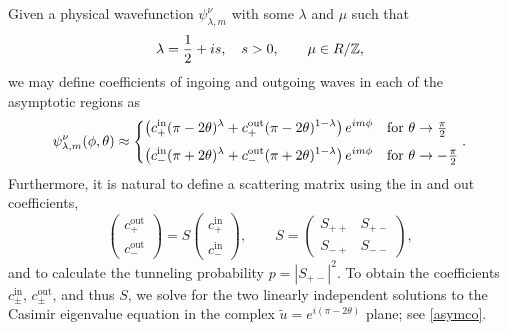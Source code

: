 \documentclass[12pt]{article}
\newcommand{\be}{\begin{equation}}
\newcommand{\ee}{\end{equation}}
\newcommand{\ZZ}{\mathbb{Z}}
\newcommand{\RR}{\mathbb{R}}
\newcommand{\IN}{\text{in}}
\newcommand{\OUT}{\text{out}}
\newcommand{\tht}{\theta}
\newcommand{\lam}{\lambda}
\newcommand{\ov}{\over}
\def\RR{R}
\begin{document}
Given a physical wavefunction $\psi_{\lam, m}^{\nu}$ with some $\lam$ and $\mu$ such that
\be
\lam={1 \ov 2}+i s,\quad s>0, \qquad \mu\in \RR/\ZZ,
\ee
we may define coefficients of ingoing and outgoing waves in each of the asymptotic regions as
\be \label{asymc}
\psi_{\lam,m}^{\nu}(\phi,\theta)\approx\begin{dcases}
\left(c_{+}^{\IN}(\pi-2\theta)^{\lambda}
+c_{+}^{\OUT}(\pi-2\theta)^{1-\lambda}\right)e^{im\phi}
&\text{for }\theta\to\tfrac{\pi}{2}\\[3pt]
\left(c_{-}^{\IN}(\pi+2\theta)^{\lambda}
+c_{-}^{\OUT}(\pi+2\theta)^{1-\lambda}\right)e^{im\phi}
&\text{for }\theta\to-\tfrac{\pi}{2}
\end{dcases}.
\ee
Furthermore, it is natural to define a scattering matrix using the in and out coefficients,  
\be
\begin{pmatrix} 
c^{\OUT}_+ \\
c^{\OUT}_- 
\end{pmatrix} = S \begin{pmatrix}c^{\IN}_+ \\
c^{\IN}_-
\end{pmatrix}, \qquad S=\begin{pmatrix} S_{++} & S_{+-} \\
S_{-+} & S_{--}
 \end{pmatrix},
 \ee
and to calculate the tunneling probability $p=|S_{+-}|^2$. To obtain the coefficients $c_{\pm}^{\text{in}}$, $c_{\pm}^{\text{out}}$, and thus $S$, we solve for the two linearly independent solutions to the Casimir eigenvalue equation in the complex $\tilde{u}=e^{i(\pi-2 \tht)}$ plane; see \eqref{asymco}. 
\end{document}
